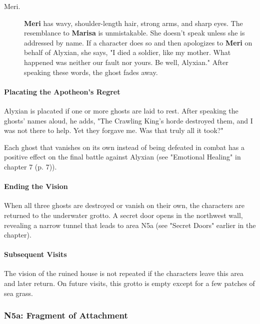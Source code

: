\documentclass[a4paper, 11pt, bg=full, twocolumn, nooutline]{dndbook}
\begin{document}
\begin{description}
\item[Meri.] \textbf{Meri} has wavy, shoulder-length hair, strong arms, and sharp eyes. The resemblance to \textbf{Marisa} is unmistakable. She doesn't speak unless she is addressed by name. If a character does so and then apologizes to \textbf{Meri} on behalf of Alyxian, she says, "I died a soldier, like my mother. What happened was neither our fault nor yours. Be well, Alyxian." After speaking these words, the ghost fades away.
\end{description}


\paragraph{Placating the Apotheon's Regret}

Alyxian is placated if one or more ghosts are laid to rest. After speaking the ghosts' names aloud, he adds, "The Crawling King's horde destroyed them, and I was not there to help. Yet they forgave me. Was that truly all it took?"

Each ghost that vanishes on its own instead of being defeated in combat has a positive effect on the final battle against Alyxian (see "Emotional Healing" in chapter 7 (p. 7)).

\paragraph{Ending the Vision}

When all three ghosts are destroyed or vanish on their own, the characters are returned to the underwater grotto. A secret door opens in the northwest wall, revealing a narrow tunnel that leads to area N5a (see "Secret Doors" earlier in the chapter).

\paragraph{Subsequent Visits}

The vision of the ruined house is not repeated if the characters leave this area and later return. On future visits, this grotto is empty except for a few patches of sea grass.

\subsubsection{N5a: Fragment of Attachment}
\end{document}
